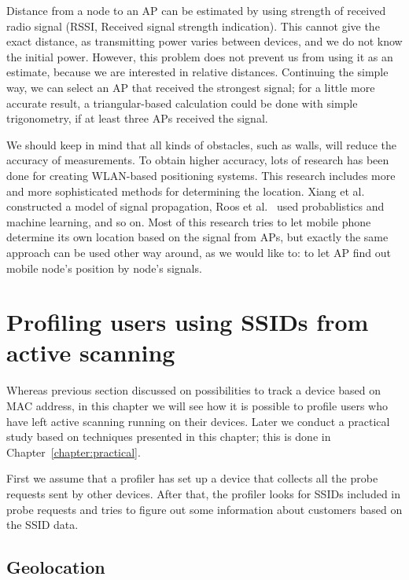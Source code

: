 \documentclass[12pt,a4paper,oneside,pdftex]{report}
\begin{document}
Distance from a node to an AP can be estimated by using strength of received radio signal (RSSI, Received signal strength indication). This cannot give the exact distance, as transmitting power varies between devices, and we do not know the initial power. However, this problem does not prevent us from using it as an estimate, because we are interested in relative distances. Continuing the simple way, we can select an AP that received the strongest signal; for a little more accurate result, a triangular-based calculation could be done with simple trigonometry, if at least three APs received the signal.

We should keep in mind that all kinds of obstacles, such as walls, will reduce the accuracy of measurements. To obtain higher accuracy, lots of research has been done for creating WLAN-based positioning systems. This research includes more and more sophisticated methods for determining the location. Xiang et al.~\cite{xiang2004} constructed a model of signal propagation, Roos et al.~\cite{roos2002} used probablistics and machine learning, and so on. Most of this research tries to let mobile phone determine its own location based on the signal from APs, but exactly the same approach can be used other way around, as we would like to: to let AP find out mobile node's position by node's signals.

\section{Profiling users using SSIDs from active scanning}
\label{sec:ssid_profiling}

Whereas previous section discussed on possibilities to track a device based on MAC address, in this chapter we will see how it is possible to profile users who have left active scanning running on their devices. Later we conduct a practical study based on techniques presented in this chapter; this is done in Chapter~\ref{chapter:practical}. 

First we assume that a profiler has set up a device that collects all the probe requests sent by other devices. After that, the profiler looks for SSIDs included in probe requests and tries to figure out some information about customers based on the SSID data.

\subsection{Geolocation}
\label{subsec:ssid_geo}
\end{document}
